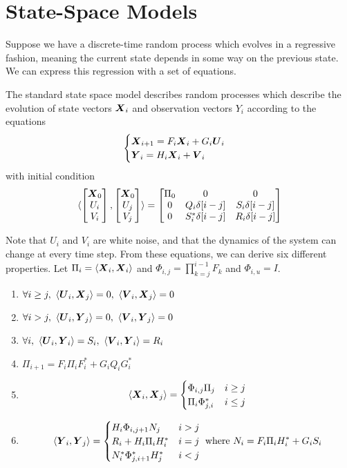 \section{State-Space Models}
Suppose we have a discrete-time random process which evolves in a regressive fashion, meaning the current state depends in some way on the previous state.
We can express this regression with a set of equations.
\begin{definition}
	The standard state space model describes random processes which describe the evolution of state vectors $\boldsymbol{X}_i$ and observation vectors $Y_i$ according to the equations
	\[
		\begin{cases}
			\boldsymbol{X}_{i+1} = F_i \boldsymbol{X}_i + G_i \boldsymbol{U}_i\\
			\boldsymbol{Y}_{i} = H_i\boldsymbol{X}_i + \boldsymbol{V}_i
		\end{cases}
	\]
	with initial condition
	\[
		\langle \begin{bmatrix}\boldsymbol{X}_0 \\ U_i \\ V_i\end{bmatrix}, \begin{bmatrix}\boldsymbol{X}_0 \\ U_j \\ V_j\end{bmatrix} \rangle = \begin{bmatrix}
			\Pi_0 & 0 & 0\\
			0 & Q_i\delta[i-j] & S_i\delta[i-j]\\
			0 & S_i^*\delta[i-j] & R_i\delta[i-j]
		\end{bmatrix}
	\]
	\label{defn:state-space-model}
\end{definition}
Note that $U_i$ and $V_i$ are white noise, and that the dynamics of the system can change at every time step.
From these equations, we can derive six different properties.
Let $\Pi_i = \langle \boldsymbol{X}_i, \boldsymbol{X}_i \rangle$ and $\Phi_{i,j} = \prod_{k=j}^{i-1}F_k$ and $\Phi_{i,u} = I$.
\begin{enumerate}
	\item $\forall i \geq j,\ \ip{\bs{U}_i}{\bs{X}_j} = 0,\ \ip{\bs{V}_i}{\bs{X}_j} = 0$
	\item $\forall i > j,\ \ip{\bs{U}_i}{\bs{Y}_j} = 0,\ \ip{\bs{V}_i}{\bs{Y}_j} = 0$
	\item $\forall i,\ \langle \boldsymbol{U}_i, \boldsymbol{Y}_i \rangle = S_i,\ \langle \boldsymbol{V}_i, \boldsymbol{Y}_i \rangle = R_i$
	\item $\Pi_{i+1} = F_i\Pi_iF_i^* + G_iQ_iG_i^*$
	\item \[
			\langle \boldsymbol{X}_i, \boldsymbol{X}_j \rangle = \begin{cases}
				\Phi_{i,j}\Pi_j & i \geq j \\
				\Pi_i \Phi_{j,i}^* & i \leq j
			\end{cases}
		\]
	\item \[
			\langle \boldsymbol{Y}_i, \boldsymbol{Y}_j \rangle = \begin{cases} 
				H_i \Phi_{i,j+1}N_j & i > j\\ 
				R_i + H_i\Pi_iH_i^* & i=j \\ 
				N_i^*\Phi^*_{j,i+1}H_j^* & i < j
			\end{cases} \text{ where } N_i=F_i\Pi_iH_i^*+G_iS_i
		\]
\end{enumerate}
